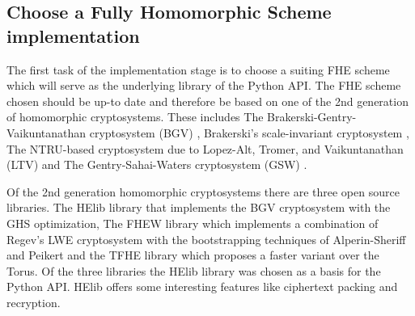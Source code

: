 \subsection{Choose a Fully Homomorphic Scheme implementation}
The first task of the implementation stage is to choose a suiting FHE scheme which will serve as the underlying library of the Python API. The FHE scheme chosen should be up-to date and therefore be based on one of the 2nd generation of homomorphic cryptosystems. These includes The Brakerski-Gentry-Vaikuntanathan cryptosystem (BGV) \cite{cryptoeprint:2011:277}, Brakerski's scale-invariant cryptosystem \cite{cryptoeprint:2012:078}, The NTRU-based cryptosystem due to Lopez-Alt, Tromer, and Vaikuntanathan (LTV)\cite{cryptoeprint:2013:094} and The Gentry-Sahai-Waters cryptosystem (GSW) \cite{cryptoeprint:2013:340}.

Of the 2nd generation homomorphic cryptosystems there are three open source libraries. The HElib library \cite{halevi2014helib} that implements the BGV cryptosystem with the GHS optimization, The FHEW library \cite{ducas2015fhew} which implements a combination of Regev's LWE cryptosystem \cite{regev2009lattices} with the bootstrapping techniques of Alperin-Sheriff and Peikert \cite{cryptoeprint:2014:094} and the TFHE library\cite{chillotti2016tfhe} which proposes a faster variant over the Torus. Of the three libraries the HElib library was chosen as a basis for the Python API. HElib offers some interesting features like ciphertext packing and recryption.
\newpage

